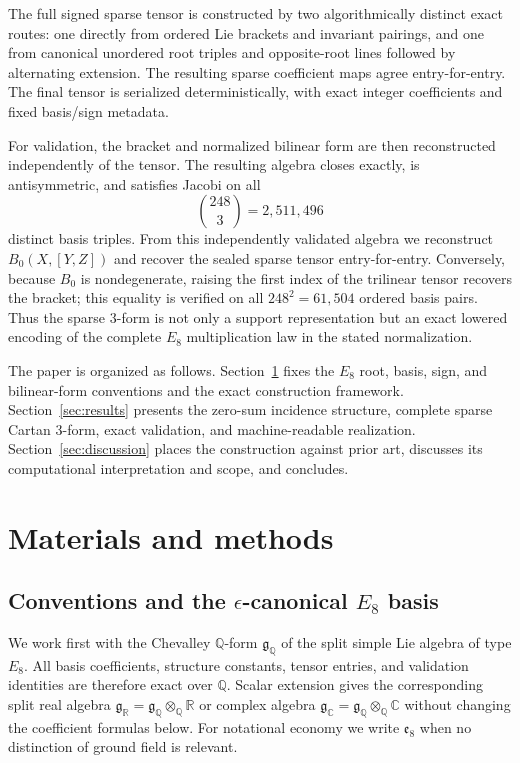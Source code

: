 \documentclass[11pt]{article}
\theoremstyle{definition}
\theoremstyle{remark}
\begin{document}
The full signed sparse tensor is constructed by two algorithmically distinct exact routes: one directly from ordered Lie brackets and invariant pairings, and one from canonical unordered root triples and opposite-root lines followed by alternating extension.  The resulting sparse coefficient maps agree entry-for-entry.  The final tensor is serialized deterministically, with exact integer coefficients and fixed basis/sign metadata.

For validation, the bracket and normalized bilinear form are then reconstructed independently of the tensor.  The resulting algebra closes exactly, is antisymmetric, and satisfies Jacobi on all
\[
\binom{248}{3}=2{,}511{,}496
\]
distinct basis triples.  From this independently validated algebra we reconstruct $B_0(X,[Y,Z])$ and recover the sealed sparse tensor entry-for-entry.  Conversely, because $B_0$ is nondegenerate, raising the first index of the trilinear tensor recovers the bracket; this equality is verified on all $248^2=61{,}504$ ordered basis pairs.  Thus the sparse $3$-form is not only a support representation but an exact lowered encoding of the complete $E_8$ multiplication law in the stated normalization.

The paper is organized as follows.  Section~\ref{sec:methods} fixes the $E_8$ root, basis, sign, and bilinear-form conventions and the exact construction framework.  Section~\ref{sec:results} presents the zero-sum incidence structure, complete sparse Cartan 3-form, exact validation, and machine-readable realization.  Section~\ref{sec:discussion} places the construction against prior art, discusses its computational interpretation and scope, and concludes.

\section{Materials and methods}\label{sec:methods}

\subsection{Conventions and the \texorpdfstring{$\epsilon$-canonical $E_8$}{epsilon-canonical E8} basis}\label{sec:conventions}

We work first with the Chevalley $\mathbb Q$-form $\mathfrak g_{\mathbb Q}$ of the split simple Lie algebra of type $E_8$.  All basis coefficients, structure constants, tensor entries, and validation identities are therefore exact over $\mathbb Q$.  Scalar extension gives the corresponding split real algebra $\mathfrak g_{\mathbb R}=\mathfrak g_{\mathbb Q}\otimes_{\mathbb Q}\mathbb R$ or complex algebra $\mathfrak g_{\mathbb C}=\mathfrak g_{\mathbb Q}\otimes_{\mathbb Q}\mathbb C$ without changing the coefficient formulas below.  For notational economy we write $\mathfrak e_8$ when no distinction of ground field is relevant.
\end{document}
